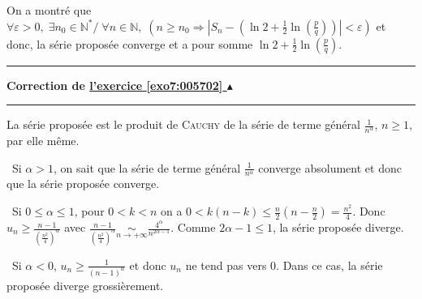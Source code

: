 \documentclass[11pt,a4paper]{article}
\newcommand{\Nn}{\mathbb{N}} \newcommand{\N}{\mathbb{N}}
\newcounter{exo}
\newcommand{\correction}[1]{\hypertarget{cor7:#1}{}\label{cor7:#1}{\bf Correction de \hyperlink{exo7:#1}{l'exercice \ref{exo7:#1} $\blacktriangle$}}\vspace{1mm}\hrule\vspace{1mm}}
\newcommand{\fincorrection}{\vspace{1mm}\hrule\vspace*{7mm}}
\begin{document}
On a montré que $\forall \varepsilon>0,\;\exists n_0\in\Nn^*/\;\forall n\in\Nn,\;(n\geqslant n_0\Rightarrow\left|S_{n}-\left(\ln2 +\frac{1}{2}\ln\left(\frac{p}{q}\right)\right)\right|<\varepsilon)$ et donc, la série proposée converge et a pour somme $\ln2 +\frac{1}{2}\ln\left(\frac{p}{q}\right)$.
\fincorrection
\correction{005702}
La série proposée est le produit de \textsc{Cauchy} de la série de terme général   $\frac{1}{n^\alpha}$, $n\geqslant1$, par elle même.

\textbullet~Si $\alpha>1$, on sait que la série de terme général $\frac{1}{n^\alpha}$ converge absolument et donc que la série proposée converge.

\textbullet~Si $0\leqslant\alpha\leqslant1$, pour $0 < k < n$ on a $0<k(n-k)\leqslant\frac{n}{2}\left(n-\frac{n}{2}\right)=\frac{n^2}{4}$. Donc $u_n\geqslant\frac{n-1}{\left(\frac{n^2}{4}\right)^\alpha}$ avec $\frac{n-1}{\left(\frac{n^2}{4}\right)^\alpha}\underset{n\rightarrow+\infty}{\sim}\frac{4^\alpha}{n^{2\alpha-1}}$. Comme $2\alpha-1\leqslant1$, la série proposée diverge.

\textbullet~Si $\alpha< 0$, $u_n\geqslant\frac{1}{(n-1)^\alpha}$  et donc $u_n$ ne tend pas vers $0$. Dans ce cas, la série proposée diverge grossièrement.
\end{document}
